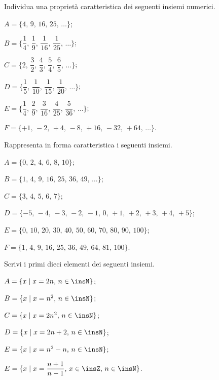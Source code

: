 \begin{esercizio}
Individua una proprietà caratteristica dei seguenti insiemi numerici.
\label{ese:6.14}
\begin{enumeratea}
\spazielenx
 \item $A=\{\text{4, 9, 16, 25, \ldots}\}$;
 \item $B=\bigg\{\dfrac{1}{4}\text{, }\dfrac{1}{9}\text{, }\dfrac{1}{16}\text{, }\dfrac{1}{25}\text{, }\ldots\bigg\}$;
 \item $C=\bigg\{2\text{, }\dfrac{3}{2}\text{, }\dfrac{4}{3}\text{, }\dfrac{5}{4}\text{, }\dfrac{6}{5}\text{, }\ldots\bigg\}$;
 \item $D=\bigg\{\dfrac{1}{5}\text{, }\dfrac{1}{10}\text{, }\dfrac{1}{15}\text{, }\dfrac{1}{20}\text{, }\ldots\bigg\}$;
 \item $E=\bigg\{\dfrac{1}{4}\text{, }\dfrac{2}{9}\text{, }\dfrac{3}{16}\text{, }\dfrac{4}{25}\text{, }\dfrac{5}{36}\text{, }\ldots\bigg\}$;
 \item $F=\{+1\text{, }-2\text{, }+4\text{, }-8\text{, }+16\text{, }-32\text{, }+64\text{, }\ldots\}$.
 \end{enumeratea}
\end{esercizio}

\begin{esercizio}
\label{ese:6.15}
Rappresenta in forma caratteristica i seguenti insiemi.
\begin{enumeratea}
\item $A=\{\text{0, 2, 4, 6, 8, 10}\}$;
\item $B=\{\text{1, 4, 9, 16, 25, 36, 49, \ldots}\}$;
\item $C=\{\text{3, 4, 5, 6, 7}\}$;
\item $D=\{-5\text{, }-4\text{, }-3\text{, }-2\text{, }-1\text{, }0\text{, }+1\text{, }+2\text{, }+3\text{, }+4\text{, }+5\}$;
\item $E=\{\text{0, 10, 20, 30, 40, 50, 60, 70, 80, 90, 100}\}$;
\item $F=\{\text{1, 4, 9, 16, 25, 36, 49, 64, 81, 100}\}$.
\end{enumeratea}
\end{esercizio}

\begin{esercizio}
\label{ese:6.16}
Scrivi i primi dieci elementi dei seguenti insiemi.
\begin{enumeratea}
\spazielenx
\item $A=\{x\mid x=2n\text{, }n\in\insN\}$;
\item $B=\{x\mid x=n^{2}\text{, }n\in\insN\}$;
\item $C=\{x\mid x=2n^{2}\text{, }n\in\insN\}$;
\item $D=\{x\mid x=2n+2\text{, }n\in\insN\}$;
\item $E=\{x\mid x=n^{2}-n\text{, }n\in\insN\}$;
\item $E=\{x\mid x=\dfrac{n+1}{n-1}\text{, }x\in\insZ\text{, }n\in\insN\}$.
\end{enumeratea}
\end{esercizio}

